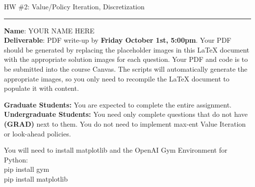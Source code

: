 \documentclass{article}
\newcommand{\ruleskip}{\bigskip\hrule\bigskip}
\begin{document}
\pagestyle{myheadings} 

{\huge
\noindent HW \#2: Value/Policy Iteration, Discretization}\\
\ruleskip
{\bf Name}: YOUR NAME HERE\\

{\bf Deliverable}:  PDF write-up by {\bf Friday October 1st, 5:00pm}.  Your PDF should be generated by replacing the placeholder images in this LaTeX document with the appropriate solution images for each question.  Your PDF and code is to be submitted into the course Canvas. The scripts will automatically generate the appropriate images, so you only need to recompile the LaTeX document to populate it with content.

\textbf{Graduate Students:} You are expected to complete the entire assignment.\\
\textbf{Undergraduate Students:} You need only complete questions that do not have \textbf{(GRAD)} next to them. You do not need to implement max-ent Value Iteration or look-ahead policies.\\

\vspace{.1in}

You will need to install matplotlib and the OpenAI Gym Environment for Python:\\
pip install gym\\
pip install matplotlib

\vspace{.2in}

\end{document}
